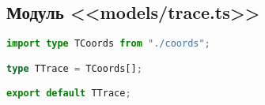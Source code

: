 \subsection{Модуль <<models/trace.ts>>}
\begin{lstlisting}[language=typescript]
import type TCoords from "./coords";

type TTrace = TCoords[];

export default TTrace;
\end{lstlisting}